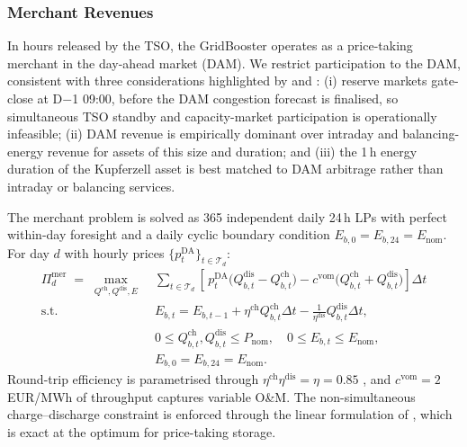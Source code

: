  
\subsubsection{Merchant Revenues}\label{Subsec3:Meth_Market_Revenues}
 
In hours released by the TSO, the GridBooster operates as a price-taking merchant in the day-ahead market (DAM). We restrict participation to the DAM, consistent with three considerations highlighted by \citet{Fluence_Consentec_2022_GridBooster_Profitability_Assessment} and \citet{Consentec_Fluence_2025_GridBooster_Monetary_Valuation}: (i) reserve markets gate-close at D$-$1 09:00, before the DAM congestion forecast is finalised, so simultaneous TSO standby and capacity-market participation is operationally infeasible; (ii) DAM revenue is empirically dominant over intraday and balancing-energy revenue for assets of this size and duration; and (iii) the 1\,h energy duration of the Kupferzell asset is best matched to DAM arbitrage rather than intraday or balancing services.
 
The merchant problem is solved as 365 independent daily 24\,h LPs with perfect within-day foresight and a daily cyclic boundary condition $E_{b,0} = E_{b,24} = E_{\mathrm{nom}}$. For day $d$ with hourly prices $\{p_t^{\mathrm{DA}}\}_{t \in \mathcal{T}_d}$:
\begin{align}
    \Pi^{\mathrm{mer}}_d \;=\; \max_{Q^{\mathrm{ch}}, Q^{\mathrm{dis}}, E}\;
    & \sum_{t \in \mathcal{T}_d}\!\left[\, p_t^{\mathrm{DA}} \bigl(Q_{b,t}^{\mathrm{dis}} - Q_{b,t}^{\mathrm{ch}}\bigr)
        - c^{\mathrm{vom}}\bigl(Q_{b,t}^{\mathrm{ch}} + Q_{b,t}^{\mathrm{dis}}\bigr) \right] \Delta t
    \label{eq:merchant_obj} \\
    \text{s.t.} \quad
    & E_{b,t} = E_{b,t-1} + \eta^{\mathrm{ch}} Q_{b,t}^{\mathrm{ch}} \Delta t - \tfrac{1}{\eta^{\mathrm{dis}}} Q_{b,t}^{\mathrm{dis}} \Delta t,
    \label{eq:soc_dynamics} \\
    & 0 \leq Q_{b,t}^{\mathrm{ch}}, Q_{b,t}^{\mathrm{dis}} \leq P_{\mathrm{nom}}, \quad
      0 \leq E_{b,t} \leq E_{\mathrm{nom}},
    \label{eq:power_energy_limits}\\
    & E_{b,0} = E_{b,24} = E_{\mathrm{nom}}.
    \label{eq:cyclic_full_soc}
\end{align}
Round-trip efficiency is parametrised through $\eta^{\mathrm{ch}}\eta^{\mathrm{dis}} = \eta = 0.85$ \citep{NREL_ATB_2024}, and $c^{\mathrm{vom}} = 2$\,EUR/MWh of throughput captures variable O\&M. The non-simultaneous charge--discharge constraint is enforced through the linear formulation of \citet{Sioshansi_Estimating_the_Value_of_Storage_PJM_2009}, which is exact at the optimum for price-taking storage.
 
